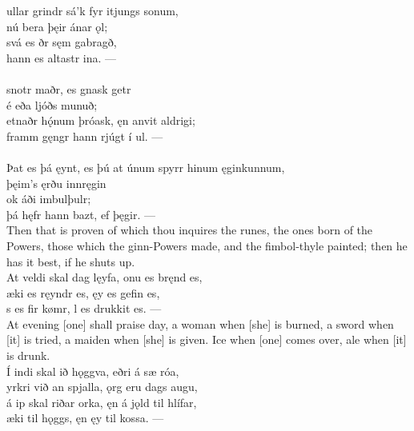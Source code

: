 \bva {}ullar grindr \hld sá'k fyr itjungs sonum, \\%
\ind nú bera þęir ánar ǫl; \\%
svá es ðr \hld sęm gabragð, \\%
\ind hann es altastr ina. —\\%

 \\

\bva {}snotr maðr, \hld es gnask getr \\%
\ind {}é eða ljóðs munuð; \\%
etnaðr hǫ́num þróask, \hld ęn anvit aldrigi; \\%
\ind framm gęngr hann rjúgt í ul. —\\%

 \\

\bva Þat es þá ęynt, \hld es þú at únum spyrr \hld hinum ęginkunnum, \\%
\ind þęim's ęrðu innręgin \\%
\ind ok áði imbulþulr; \\%
\ind þá hęfr hann bazt, ef þęgir. —\\%

\bvb Then that is proven of which thou inquires the runes, the ones born of the Powers, those which the ginn-Powers made, and the fimbol-thyle painted; then he has it best, if he shuts up. \\

\bva At veldi skal dag lęyfa, \hld {}onu es bręnd es, \\%
æki es ręyndr es, \hld {}ęy es gefin es, \\%
s es fir kømr, \hld {}l es drukkit es. —\\%

\bvb At evening [one] shall praise day, a woman when [she] is burned, a sword when [it] is tried, a maiden when [she] is given. Ice when [one] comes over, ale when [it] is drunk. \\

\bva Í indi skal ið hǫggva, \hld {}eðri á sæ róa, \\%
yrkri við an spjalla, \hld {}ǫrg eru dags augu, \\%
á ip skal riðar orka, \hld ęn á jǫld til hlífar, \\%
æki til hǫggs, \hld ęn ęy til kossa. —\\%

